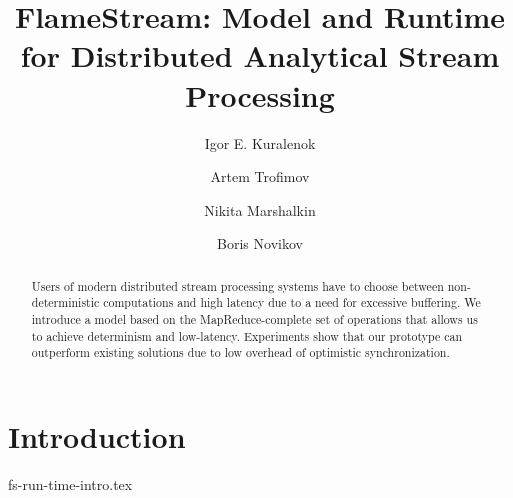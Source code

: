 \documentclass{llncs}
\newcommand {\FlameStream} {FlameStream}
\begin{document}
\title {\FlameStream: Model and Runtime for Distributed Analytical Stream Processing}
\author{Igor E. Kuralenok \and Artem Trofimov \and Nikita Marshalkin \and Boris Novikov}

\maketitle
{}

\begin{abstract}
Users of modern distributed stream processing systems have to choose between non-deterministic computations and high latency due to a need for excessive buffering. 
We introduce a model based on the MapReduce-complete set of operations that allows us to achieve determinism and low-latency.
Experiments show that our prototype can outperform existing solutions due to low overhead of optimistic synchronization.


\end {abstract}

\section {Introduction}
 {fs-run-time-intro.tex}
\end{document}
